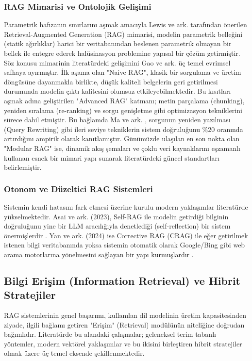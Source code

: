 \documentclass[12pt,a4paper]{report}
\begin{document}
\subsubsection{RAG Mimarisi ve Ontolojik Gelişimi}
Parametrik hafızanın sınırlarını aşmak amacıyla Lewis ve ark. \cite{lewis2020retrieval} tarafından önerilen Retrieval-Augmented Generation (RAG) mimarisi, modelin parametrik belleğini (statik ağırlıklar) harici bir veritabanından beslenen parametrik olmayan bir bellek ile entegre ederek halüsinasyon problemine yapısal bir çözüm getirmiştir. Söz konusu mimarinin literatürdeki gelişimini Gao ve ark. \cite{gao2024comprehensive} üç temel evrimsel safhaya ayırmıştır. İlk aşama olan "Naive RAG", klasik bir sorgulama ve üretim döngüsüne dayanmakla birlikte, düşük kaliteli belgelerin geri getirilmesi durumunda modelin çıktı kalitesini olumsuz etkileyebilmektedir. Bu kısıtları aşmak adına geliştirilen "Advanced RAG" katmanı; metin parçalama (chunking), yeniden sıralama (re-ranking) ve sorgu genişletme gibi optimizasyon tekniklerini sürece dahil etmiştir. Bu bağlamda Ma ve ark. \cite{ma2023query}, sorgunun yeniden yazılması (Query Rewriting) gibi ileri seviye tekniklerin sistem doğruluğunu \%20 oranında artırdığını ampirik olarak kanıtlamıştır. Günümüzde ulaşılan en son nokta olan "Modular RAG" ise, dinamik akış şemaları ve çoklu veri kaynaklarını eşzamanlı kullanan esnek bir mimari yapı sunarak literatürdeki güncel standartları belirlemiştir.

\subsubsection{Otonom ve Düzeltici RAG Sistemleri}
Sistemin kendi hatasını fark etmesi üzerine kurulu modern yaklaşımlar literatürde yükselmektedir. Asai ve ark. (2023), Self-RAG ile modelin getirdiği bilginin doğruluğunu yine bir LLM aracılığıyla denetlediği (self-reflection) bir sistem önermişlerdir \cite{asai2023selfrag}. Yan ve ark. (2024) ise Corrective RAG (CRAG) ile eğer getirilmek istenen bilgi veritabanında yoksa sistemin otomatik olarak Google/Bing gibi web arama motorlarına yönelmesini sağlayan bir yapı kurmuşlardır \cite{yan2024crag}.

\subsection{Bilgi Erişim (Information Retrieval) ve Hibrit Stratejiler}
RAG sistemlerinin genel başarımı, kullanılan dil modelinin üretim kapasitesinden ziyade, ilgili bağlamı getiren "Erişim" (Retrieval) modülünün niteliğine doğrudan bağımlıdır. Literatürde bu alandaki çalışmalar; geleneksel terim tabanlı yöntemler, modern vektörel yaklaşımlar ve bu ikisini birleştiren hibrit stratejiler olmak üzere üç temel eksende şekillenmektedir.
\end{document}
